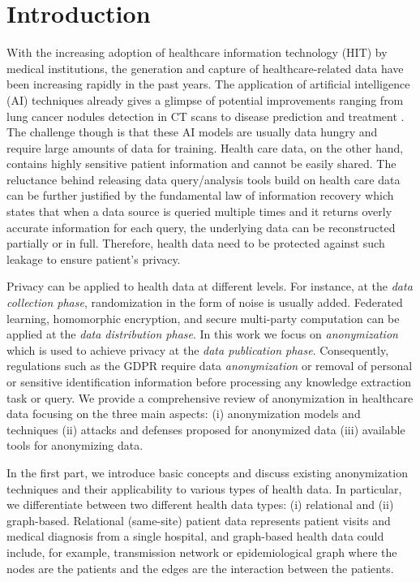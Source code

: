 \documentclass{bioinfo}
\begin{document}
\maketitle

\section{Introduction}
\label{intro}

With the increasing adoption of healthcare information technology (HIT) by medical institutions, the generation and capture of healthcare-related data have been increasing rapidly in the past years. The application of artificial intelligence (AI) techniques already gives a glimpse of potential improvements ranging from lung cancer nodules detection in CT scans to disease prediction and treatment \cite{liu2018mtmr, pakbin2018prediction, tang2018predictive}. The challenge though is that these AI models are usually data hungry and require large amounts of data for training. Health care data, on the other hand, contains highly sensitive patient information and cannot be easily shared. 
The reluctance behind releasing data query/analysis tools build on health care data can be further justified by the fundamental law of information recovery \cite{CynthiaDwork10.1561/0400000042} which states that when a data source is queried multiple times and it returns overly accurate information for each query, the underlying data can be reconstructed partially or in full. Therefore, health data need to be protected against such leakage to ensure patient's privacy.

Privacy can be applied to health data at different levels. For instance, at the \emph{data collection phase}, randomization in the form of noise is usually added. Federated learning, homomorphic encryption, and secure multi-party computation can be applied at the \emph{data distribution phase}. 
In this work we focus on \emph{anonymization} which is used to achieve privacy at the \emph{data publication phase}. Consequently, regulations such as the GDPR \cite{officialgrpr2016} require data \emph{anonymization} or removal of personal or sensitive identification information before processing any knowledge extraction task or query. We provide a comprehensive review of anonymization in healthcare data focusing on the three main aspects: (i) anonymization models and techniques (ii) attacks and defenses proposed for anonymized data (iii) available tools for anonymizing data. 

In the first part, we introduce basic concepts and discuss existing anonymization techniques and their applicability to various types of health data. In particular, we differentiate between two different health data types: (i) relational and (ii) graph-based. Relational (same-site) patient data represents patient visits and medical diagnosis from a single hospital, and graph-based health data could include, for example, transmission network or epidemiological graph where the nodes are the patients and the edges are the interaction between the patients.
\end{document}
